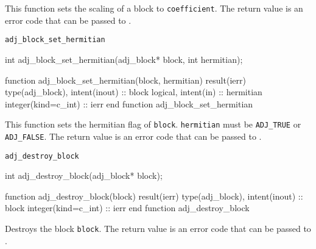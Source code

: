 This function sets the scaling of a block to \texttt{coefficient}. 
The return value is an error code that can be passed to .


\begin{boxwithtitle}{\texttt{adj_block_set_hermitian}}
\begin{minipage}{\columnwidth}
\begin{ccode}
  int adj_block_set_hermitian(adj_block* block, int hermitian);
\end{ccode}
\begin{fortrancode}
  function adj_block_set_hermitian(block, hermitian) result(ierr)
    type(adj_block), intent(inout) :: block
    logical, intent(in) :: hermitian
    integer(kind=c_int) :: ierr
  end function adj_block_set_hermitian
\end{fortrancode}
\end{minipage}
\end{boxwithtitle}

This function sets the hermitian flag of \texttt{block}. \texttt{hermitian} must be \texttt{ADJ_TRUE} or \texttt{ADJ_FALSE}.
The return value is an error code that can be passed to .

\begin{boxwithtitle}{\texttt{adj_destroy_block}}
\begin{minipage}{\columnwidth}
\begin{ccode}
  int adj_destroy_block(adj_block* block);
\end{ccode}
\begin{fortrancode}
  function adj_destroy_block(block) result(ierr) 
    type(adj_block), intent(inout) :: block
    integer(kind=c_int) :: ierr
  end function adj_destroy_block
\end{fortrancode}
\end{minipage}
\end{boxwithtitle}

Destroys the block \texttt{block}.
The return value is an error code that can be passed to .



